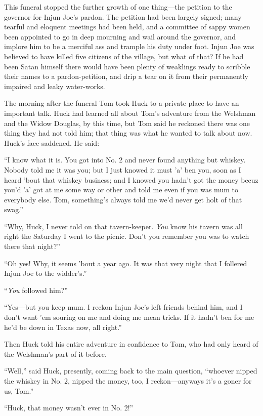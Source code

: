 \documentclass{book}
\begin{document}
This funeral stopped the further growth of one thing—the petition to the governor for Injun Joe’s pardon. The petition had been largely signed; many tearful and eloquent meetings had been held, and a committee of sappy women been appointed to go in deep mourning and wail around the governor, and implore him to be a merciful ass and trample his duty under foot. Injun Joe was believed to have killed five citizens of the village, but what of that? If he had been Satan himself there would have been plenty of weaklings ready to scribble their names to a pardon-petition, and drip a tear on it from their permanently impaired and leaky water-works.

The morning after the funeral Tom took Huck to a private place to have an important talk. Huck had learned all about Tom’s adventure from the Welshman and the Widow Douglas, by this time, but Tom said he reckoned there was one thing they had not told him; that thing was what he wanted to talk about now. Huck’s face saddened. He said:

“I know what it is. You got into No. 2 and never found anything but whiskey. Nobody told me it was you; but I just knowed it must ’a’ ben you, soon as I heard ’bout that whiskey business; and I knowed you hadn’t got the money becuz you’d ’a’ got at me some way or other and told me even if you was mum to everybody else. Tom, something’s always told me we’d never get holt of that swag.”

“Why, Huck, I never told on that tavern-keeper. \emph{You} know his tavern was all right the Saturday I went to the picnic. Don’t you remember you was to watch there that night?”

“Oh yes! Why, it seems ’bout a year ago. It was that very night that I follered Injun Joe to the widder’s.”

“\emph{You} followed him?”

“Yes—but you keep mum. I reckon Injun Joe’s left friends behind him, and I don’t want ’em souring on me and doing me mean tricks. If it hadn’t ben for me he’d be down in Texas now, all right.”

Then Huck told his entire adventure in confidence to Tom, who had only heard of the Welshman’s part of it before.

“Well,” said Huck, presently, coming back to the main question, “whoever nipped the whiskey in No. 2, nipped the money, too, I reckon—anyways it’s a goner for us, Tom.”

“Huck, that money wasn’t ever in No. 2!”
\end{document}
